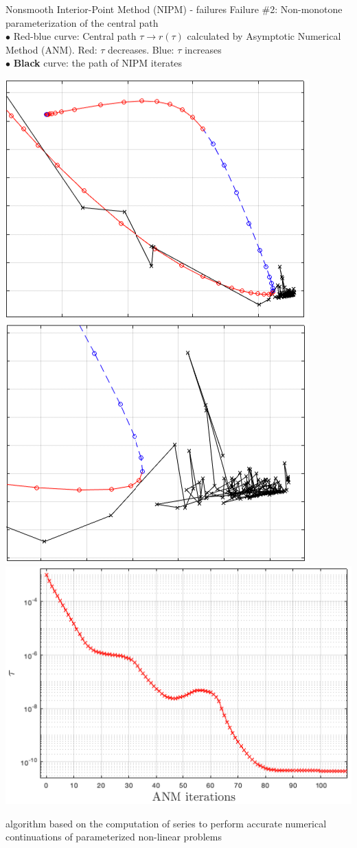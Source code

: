 \begin{frame}{Nonsmooth Interior-Point Method (NIPM) - failures}
    \vspace{-0.1cm}
    {\large Failure \#2:} Non-monotone parameterization of the central path \\[4pt]
    {$\bullet$} {\small {\color{red}Red}-{\color{blue}blue} curve: Central path $\tau \to r(\tau)$ calculated by Asymptotic Numerical Method (ANM). {\color{red}Red}: $\tau$ decreases. {\color{blue}Blue}: $\tau$ increases \\[6pt]
    {$\bullet$} \textbf{Black} curve: the path of NIPM iterates}
    \begin{center}
        \includegraphics[width=0.32\linewidth]{./figure/IPM/images/anm_cone6.png}
        \includegraphics[width=0.32\linewidth]{./figure/IPM/images/anm_cone6_2.png}
        \includegraphics[width=0.34\linewidth]{./figure/IPM/images/tau2t.png}
    \end{center}
     algorithm based on the computation of series to perform accurate numerical continuations of parameterized  non-linear problems

  \end{frame}
